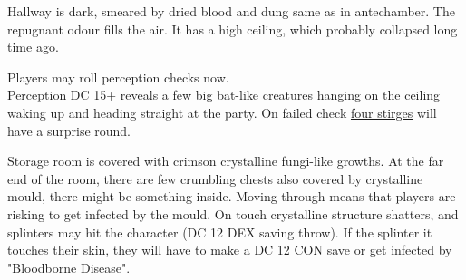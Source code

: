 \documentclass[10pt,onecolumn,twoside,openany,bg=full,layout=true]{dndbook}
\begin{document}
Hallway is dark, smeared by dried blood and dung same as in antechamber.
The repugnant odour fills the air.
It has a high ceiling, which probably collapsed long time ago.

Players may roll perception checks now. \\
Perception DC 15+ reveals a few big bat-like creatures hanging on the ceiling waking up and heading straight at the party.
On failed check \href{https://www.dndbeyond.com/monsters/17023-stirge}{four stirges} will have a surprise round.

Storage room is covered with crimson crystalline fungi-like growths.
At the far end of the room, there are few crumbling chests also covered by crystalline mould, there might be something inside.
Moving through means that players are risking to get infected by the mould.
On touch crystalline structure shatters, and splinters may hit the character (DC 12 DEX saving throw).
If the splinter it touches their skin, they will have to make a DC 12 CON save or get infected by "Bloodborne Disease".

\vfill
\newpage
\end{document}
